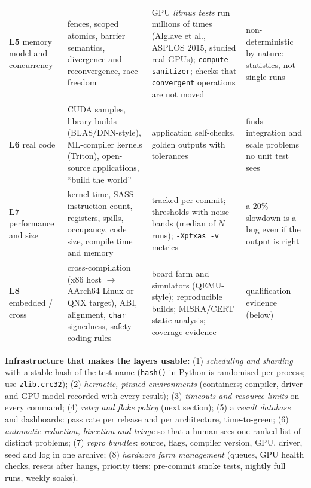 \documentclass[10pt,a4paper,openany,oneside]{report}
\begin{document}
\begin{center}
\begin{xltabular}{\textwidth}{@{}L{2.9cm}L{4.5cm}L{4.1cm}Y@{}}
\textbf{L5} memory model and concurrency & fences, scoped atomics, barrier semantics, divergence and reconvergence, race freedom & GPU \emph{litmus tests} run millions of times (Alglave et al., ASPLOS 2015, studied real GPUs); \texttt{compute-sanitizer}; checks that \texttt{convergent} operations are not moved & non-deterministic by nature: statistics, not single runs\\
\textbf{L6} real code & CUDA samples, library builds (BLAS/DNN-style), ML-compiler kernels (Triton), open-source applications, ``build the world'' & application self-checks, golden outputs with tolerances & finds integration and scale problems no unit test sees\\
\textbf{L7} performance and size & kernel time, SASS instruction count, registers, spills, occupancy, code size, compile time and memory & tracked per commit; thresholds with noise bands (median of $N$ runs); \texttt{-Xptxas -v} metrics & a 20\% slowdown is a bug even if the output is right\\
\textbf{L8} embedded / cross & cross-compilation (x86 host $\to$ AArch64 Linux or QNX target), ABI, alignment, \texttt{char} signedness, safety coding rules & board farm and simulators (QEMU-style); reproducible builds; MISRA/CERT static analysis; coverage evidence & qualification evidence (below)\\
\bottomrule
\end{xltabular}
\end{center}
\textbf{Infrastructure that makes the layers usable:} (1) \emph{scheduling and sharding} with a stable hash of the test name (\texttt{hash()} in Python is randomised per process; use \texttt{zlib.crc32}); (2) \emph{hermetic, pinned environments} (containers; compiler, driver and GPU model recorded with every result); (3) \emph{timeouts and resource limits} on every command; (4) \emph{retry and flake policy} (next section); (5) a \emph{result database} and dashboards: pass rate per release and per architecture, time-to-green; (6) \emph{automatic reduction, bisection and triage} so that a human sees one ranked list of distinct problems; (7) \emph{repro bundles}: source, flags, compiler version, GPU, driver, seed and log in one archive; (8) \emph{hardware farm management} (queues, GPU health checks, resets after hangs, priority tiers: pre-commit smoke tests, nightly full runs, weekly soaks).
\end{document}
